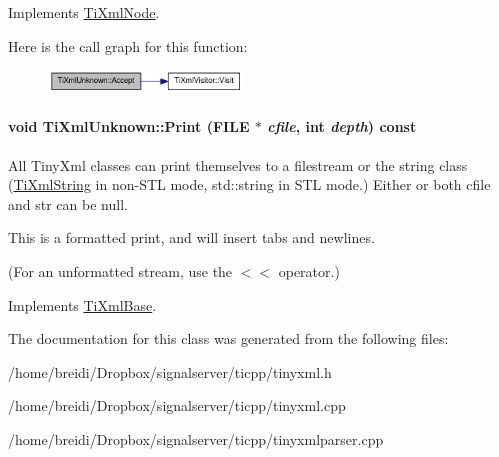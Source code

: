 Implements \hyperlink{class_ti_xml_node_acc0f88b7462c6cb73809d410a4f5bb86}{TiXmlNode}.

Here is the call graph for this function:\nopagebreak
\begin{figure}[H]
\begin{center}
\leavevmode
\includegraphics[width=146pt]{class_ti_xml_unknown_a4e54d7482e05a837cf83c925cc683380_cgraph}
\end{center}
\end{figure}
\hypertarget{class_ti_xml_unknown_a025f19c21ef01ea9be50febb8fe0ba06}{
\paragraph[{Print}]{\setlength{\rightskip}{0pt plus 5cm}void TiXmlUnknown::Print (FILE $\ast$ {\em cfile}, \/  int {\em depth}) const}\hfill}
\label{class_ti_xml_unknown_a025f19c21ef01ea9be50febb8fe0ba06}
All TinyXml classes can print themselves to a filestream or the string class (\hyperlink{class_ti_xml_string}{TiXmlString} in non-\/STL mode, std::string in STL mode.) Either or both cfile and str can be null.

This is a formatted print, and will insert tabs and newlines.

(For an unformatted stream, use the $<$$<$ operator.) 

Implements \hyperlink{class_ti_xml_base_a0de56b3f2ef14c65091a3b916437b512}{TiXmlBase}.

The documentation for this class was generated from the following files:\begin{DoxyCompactItemize}
\item 
/home/breidi/Dropbox/signalserver/ticpp/tinyxml.h\item 
/home/breidi/Dropbox/signalserver/ticpp/tinyxml.cpp\item 
/home/breidi/Dropbox/signalserver/ticpp/tinyxmlparser.cpp\end{DoxyCompactItemize}
